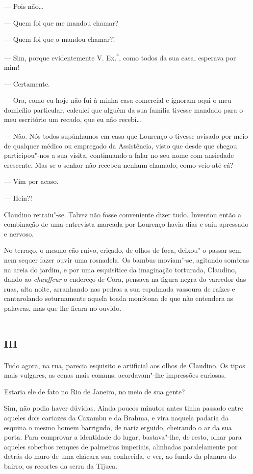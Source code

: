 --- Pois não\ldots{}

--- Quem foi que me mandou chamar?

--- Quem foi que o mandou chamar?!

--- Sim, porque evidentemente V. Ex.\textsuperscript{ª}, como todos da
sua casa, esperava por mim!

--- Certamente.

--- Ora, como eu hoje não fui à minha casa comercial e ignoram aqui o
meu domicílio particular, calculei que alguém da sua família tivesse
mandado para o meu escritório um recado, que eu não recebi\ldots{}

--- Não. Nós todos supúnhamos em casa que Lourenço o tivesse avisado por
meio de qualquer médico ou empregado da Assistência, visto que desde que
chegou participou"-nos a sua visita, continuando a falar no seu nome com
ansiedade crescente. Mas se o senhor não recebeu nenhum chamado, como
veio até cá?

--- Vim por acaso.

--- Hein?!

Claudino retraiu"-se. Talvez não fosse conveniente dizer tudo. Inventou
então a combinação de uma entrevista marcada por Lourenço havia dias e
saiu apressado e nervoso.

No terraço, o mesmo cão ruivo, eriçado, de olhos de foca, deixou"-o
passar sem nem sequer fazer ouvir uma rosnadela. Os bambus moviam"-se,
agitando sombras na areia do jardim, e por uma esquisitice da imaginação
torturada, Claudino, dando ao \emph{chauffeur}
o endereço de Cora, pensava na figura negra do varredor das ruas, alta
noite, arranhando nas pedras a sua espalmada vassoura de raízes e
cantarolando soturnamente aquela toada monótona de que não entendera as
palavras, mas que lhe ficara no ouvido.

\section{\textsc{iii}}

Tudo agora, na rua, parecia esquisito e artificial aos olhos de
Claudino. Os tipos mais vulgares, as cenas mais comuns, acordavam"-lhe
impressões curiosas.

Estaria ele de fato no Rio de Janeiro, no meio de sua gente?

Sim, não podia haver dúvidas. Ainda poucos minutos antes tinha passado
entre aqueles dois cartazes da Caxambu e da Brahma, e vira naquela
padaria da esquina o mesmo homem barrigudo, de nariz erguido, cheirando
o ar da sua porta. Para comprovar a identidade do lugar, bastava"-lhe, de
resto, olhar para aqueles soberbos renques de palmeiras imperiais,
alinhadas paralelamente por detrás do muro de uma chácara sua conhecida,
e ver, ao fundo da planura do bairro, os recortes da serra da Tijuca.

